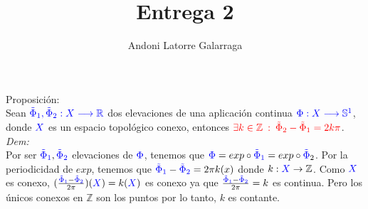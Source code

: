 \documentclass{article}
\title{Entrega 2}
\author{Andoni Latorre Galarraga}
\date{}
\newcommand{\bb}[1]{\mathbb{#1}}
\begin{document}
\maketitle
\textcolor{WildStrawberry}{Proposición:}\\
Sean $\textcolor{blue}{\tilde{\Phi}_1, \tilde{\Phi}_2:X\longrightarrow \bb{R}}$ dos elevaciones de una aplicación continua $\textcolor{blue}{\Phi: X \longrightarrow \bb{S}^1}$, donde $\textcolor{blue}{X}$ es un espacio topológico conexo, entonces $\textcolor{red}{\exists k\in \bb{Z} \: :\: \tilde{\Phi}_2-\tilde{\Phi}_1 = 2k\pi}$.\\

\textcolor{WildStrawberry}{\textit{Dem:}}\\
Por ser $\textcolor{blue}{\tilde{\Phi}_1},\textcolor{blue}{\tilde{\Phi}_2}$ elevaciones de $\textcolor{blue}{\Phi}$, tenemos que $\textcolor{blue}{\Phi} = exp \circ \textcolor{blue}{\tilde{\Phi}_1} = exp \circ \textcolor{blue}{\tilde{\Phi}}_2$. Por la periodicidad de $exp$, tenemos que $\textcolor{blue}{\tilde{\Phi}_1} - \textcolor{blue}{\tilde{\Phi}_2} = 2\pi k(x)$ donde $k:\textcolor{blue}{X}\rightarrow \bb{Z}$. Como $\textcolor{blue}{X}$ es conexo, $(\frac{\textcolor{blue}{\tilde{\Phi}_1}- \textcolor{blue}{\tilde{\Phi}_2}}{2\pi})(\textcolor{blue}{X})=k(\textcolor{blue}{X})$ es conexo ya que $\frac{\textcolor{blue}{\tilde{\Phi}_1}- \textcolor{blue}{\tilde{\Phi}_2}}{2\pi}=k$ es continua. Pero los únicos conexos en $\bb{Z}$ son los puntos por lo tanto, $k$ es contante.
\end{document}
